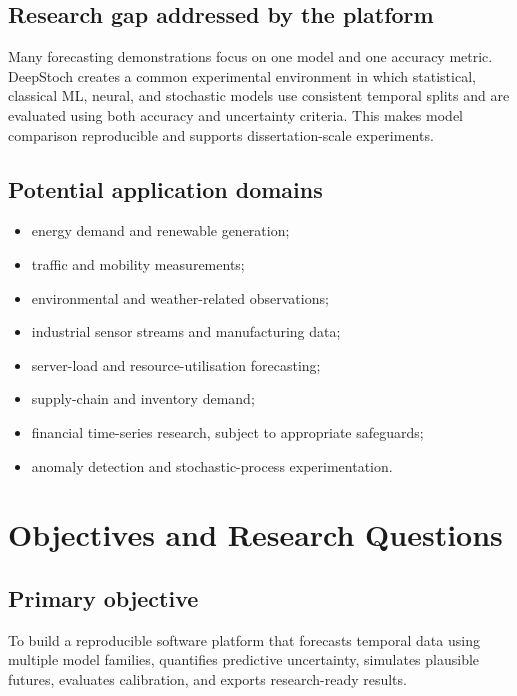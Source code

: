\documentclass[11pt,a4paper]{report}
\begin{document}
\section{Research gap addressed by the platform}
Many forecasting demonstrations focus on one model and one accuracy metric. DeepStoch creates a common experimental environment in which statistical, classical ML, neural, and stochastic models use consistent temporal splits and are evaluated using both accuracy and uncertainty criteria. This makes model comparison reproducible and supports dissertation-scale experiments.

\section{Potential application domains}
\begin{itemize}[leftmargin=*]
\item energy demand and renewable generation;
\item traffic and mobility measurements;
\item environmental and weather-related observations;
\item industrial sensor streams and manufacturing data;
\item server-load and resource-utilisation forecasting;
\item supply-chain and inventory demand;
\item financial time-series research, subject to appropriate safeguards;
\item anomaly detection and stochastic-process experimentation.
\end{itemize}

\chapter{Objectives and Research Questions}
\section{Primary objective}
To build a reproducible software platform that forecasts temporal data using multiple model families, quantifies predictive uncertainty, simulates plausible futures, evaluates calibration, and exports research-ready results.
\end{document}

